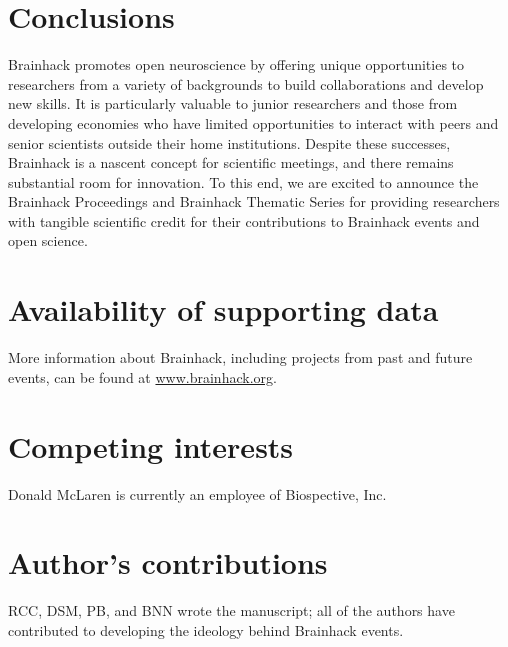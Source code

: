 \documentclass[11pt]{bmc_article_s50}
\begin{document}
\section*{Conclusions}

Brainhack promotes open neuroscience by offering unique opportunities to researchers from a variety of backgrounds to build collaborations and develop new skills. It is particularly valuable to junior researchers and those from developing economies who have limited opportunities to interact with peers and senior scientists outside their home institutions. Despite these successes, Brainhack is a nascent concept for scientific meetings, and there remains substantial room for innovation. To this end, we are excited to announce the Brainhack Proceedings and Brainhack Thematic Series for providing researchers with tangible scientific credit for their contributions to Brainhack events and open science.


\section*{Availability of supporting data}
More information about Brainhack, including projects from past and future events, can be found at \href{http://www.brainhack.org}{www.brainhack.org}.

\section*{Competing interests}
Donald McLaren is currently an employee of Biospective, Inc.

\section*{Author's contributions}
RCC, DSM, PB, and BNN wrote the manuscript; %
 all of the authors have contributed to developing the ideology behind Brainhack events.
\end{document}
